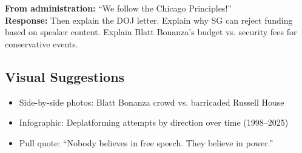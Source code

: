 \documentclass[11pt,letterpaper]{article}
\begin{document}
\textbf{From administration:} ``We follow the Chicago Principles!''\\
\textbf{Response:} Then explain the DOJ letter. Explain why SG can reject funding based on speaker content. Explain Blatt Bonanza's budget vs. security fees for conservative events.

\subsection{Visual Suggestions}
\begin{itemize}[noitemsep]
    \item Side-by-side photos: Blatt Bonanza crowd vs. barricaded Russell House
    \item Infographic: Deplatforming attempts by direction over time (1998--2025)
    \item Pull quote: ``Nobody believes in free speech. They believe in power.''
\end{itemize}
\end{document}
